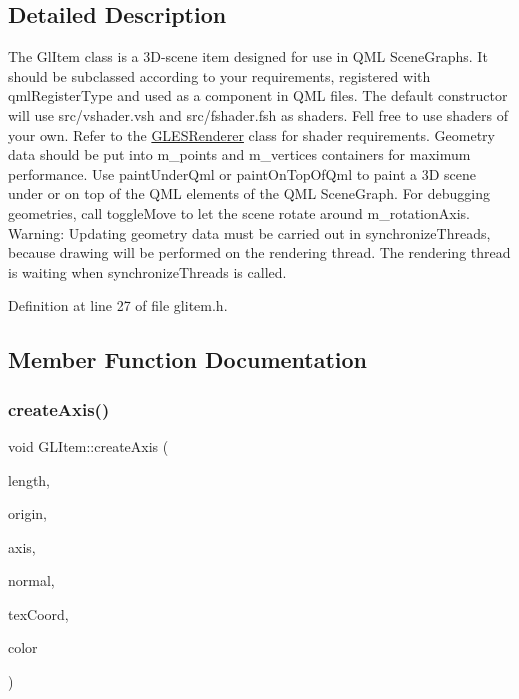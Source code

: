 \subsection{Detailed Description}
The Gl\+Item class is a 3D-\/scene item designed for use in Q\+ML Scene\+Graphs. It should be subclassed according to your requirements, registered with qml\+Register\+Type and used as a component in Q\+ML files. The default constructor will use src/vshader.\+vsh and src/fshader.\+fsh as shaders. Fell free to use shaders of your own. Refer to the \mbox{\hyperlink{class_g_l_e_s_renderer}{G\+L\+E\+S\+Renderer}} class for shader requirements. Geometry data should be put into m\+\_\+points and m\+\_\+vertices containers for maximum performance. Use paint\+Under\+Qml or paint\+On\+Top\+Of\+Qml to paint a 3D scene under or on top of the Q\+ML elements of the Q\+ML Scene\+Graph. For debugging geometries, call toggle\+Move to let the scene rotate around m\+\_\+rotation\+Axis. Warning\+: Updating geometry data must be carried out in synchronize\+Threads, because drawing will be performed on the rendering thread. The rendering thread is waiting when synchronize\+Threads is called. 



Definition at line 27 of file glitem.\+h.



\subsection{Member Function Documentation}
\mbox{\label{class_g_l_item_a2153cac833846fcd3b8b507bff244406}} 
\subsubsection{\texorpdfstring{createAxis()}{createAxis()}}
{\footnotesize\ttfamily void G\+L\+Item\+::create\+Axis (\begin{DoxyParamCaption}\item[{float}]{length,  }\item[{const Q\+Vector3D \&}]{origin,  }\item[{const Q\+Vector3D \&}]{axis,  }\item[{const Q\+Vector3D \&}]{normal,  }\item[{const Q\+Vector3D \&}]{tex\+Coord,  }\item[{const \mbox{\hyperlink{class_g_l_color_rgba}{G\+L\+Color\+Rgba}} \&}]{color }\end{DoxyParamCaption})\hspace{0.3cm}{\ttfamily [protected]}}




